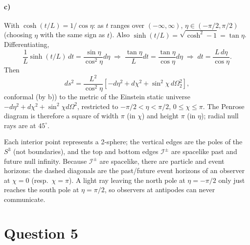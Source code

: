 \documentclass[11pt]{article}
\begin{document}
\paragraph{c)} With $\cosh(t/L)=1/\cos\eta$: as $t$ ranges over $(-\infty,\infty)$, $\eta\in(-\pi/2,\pi/2)$ (choosing $\eta$ with the same sign as $t$). Also $\sinh(t/L)=\sqrt{\cosh^2-1}=\tan\eta$. Differentiating,
\[
\frac1L\sinh(t/L)\,dt=\frac{\sin\eta}{\cos^2\eta}d\eta\;\Rightarrow\;\frac{\tan\eta}{L}dt=\frac{\tan\eta}{\cos\eta}d\eta\;\Rightarrow\;dt=\frac{L\,d\eta}{\cos\eta}.
\]
Then
\[
ds^2=\frac{L^2}{\cos^2\eta}\left[-d\eta^2+d\chi^2+\sin^2\chi\,d\Omega_2^2\right],
\]
conformal (by b)) to the metric of the Einstein static universe $-d\eta^2+d\chi^2+\sin^2\chi d\Omega^2$, restricted to $-\pi/2<\eta<\pi/2$, $0\le\chi\le\pi$. The Penrose diagram is therefore a square of width $\pi$ (in $\chi$) and height $\pi$ (in $\eta$); radial null rays are at $45^\circ$.

\begin{center}
\end{center}
Each interior point represents a 2-sphere; the vertical edges are the poles of the $S^3$ (not boundaries), and the top and bottom edges $\mathcal I^\pm$ are spacelike past and future null infinity. Because $\mathcal I^\pm$ are spacelike, there are particle and event horizons: the dashed diagonals are the past/future event horizons of an observer at $\chi=0$ (resp.\ $\chi=\pi$). A light ray leaving the north pole at $\eta=-\pi/2$ only just reaches the south pole at $\eta=\pi/2$, so observers at antipodes can never communicate.

\section*{Question 5}
\end{document}
